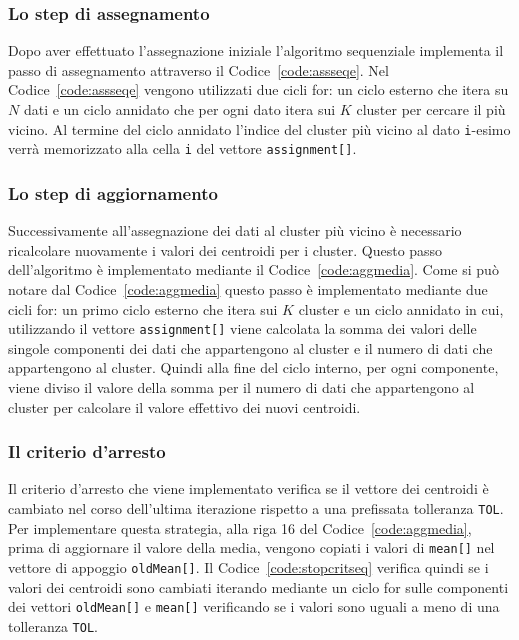 \documentclass[10pt,twocolumn,letterpaper]{article}
\begin{document}
\subsubsection*{Lo step di assegnamento}
Dopo aver effettuato l'assegnazione iniziale l'algoritmo sequenziale implementa il passo di assegnamento attraverso il Codice~\ref{code:assseqe}. Nel Codice~\ref{code:assseqe} vengono utilizzati due cicli for: un ciclo esterno che itera su $N$ dati e un ciclo annidato che per ogni dato itera sui $K$ cluster per cercare il più vicino. Al termine del ciclo annidato l'indice del cluster più vicino al dato \texttt{i}-esimo verrà memorizzato alla cella \texttt{i} del vettore \texttt{assignment[]}.

\subsubsection*{Lo step di aggiornamento}
Successivamente all'assegnazione dei dati al cluster più vicino è necessario ricalcolare nuovamente i valori dei centroidi per i cluster. Questo passo dell'algoritmo è implementato mediante il Codice~\ref{code:aggmedia}. Come si può notare dal Codice~\ref{code:aggmedia} questo passo è implementato mediante due cicli for: un primo ciclo esterno che itera sui $K$ cluster e un ciclo annidato in cui, utilizzando il vettore \texttt{assignment[]} viene calcolata la somma dei valori delle singole componenti dei dati che appartengono al cluster e il numero di dati che appartengono al cluster. Quindi alla fine del ciclo interno, per ogni componente, viene diviso il valore della somma per il numero di dati che appartengono al cluster per calcolare il valore effettivo dei nuovi centroidi.

\subsubsection*{Il criterio d'arresto}

Il criterio d'arresto che viene implementato verifica se il vettore dei centroidi è cambiato nel corso dell'ultima iterazione rispetto a una prefissata tolleranza \texttt{TOL}. Per implementare questa strategia, alla riga 16 del Codice~\ref{code:aggmedia}, prima di aggiornare il valore della media, vengono copiati i valori di \texttt{mean[]} nel vettore di appoggio \texttt{oldMean[]}. Il Codice~\ref{code:stopcritseq} verifica quindi se i valori dei centroidi sono cambiati iterando mediante un ciclo for sulle componenti dei vettori \texttt{oldMean[]} e \texttt{mean[]} verificando se i valori sono uguali a meno di una tolleranza \texttt{TOL}.
\end{document}
